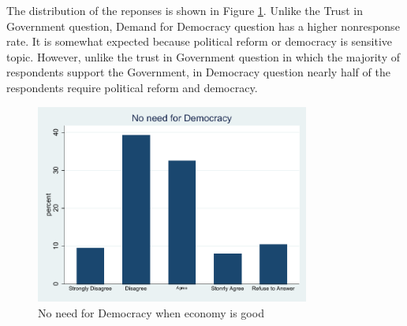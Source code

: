 \documentclass[12pt]{article}\usepackage[]{graphicx}\usepackage[]{color}
\begin{document}
The distribution of the reponses is shown in Figure \ref{democracy}. Unlike the Trust in Government question, Demand for Democracy question has a higher nonresponse rate. It is somewhat expected because political reform or democracy is sensitive topic. However, unlike the trust in Government question in which the majority of respondents support the Government, in Democracy question nearly half of the respondents require political reform and democracy.

\begin{figure}[H]
	\centering
	\includegraphics[width=90mm]{Democracy}
	\caption{\label{democracy} No need for Democracy when economy is good}
\end{figure}	
\end{document}
